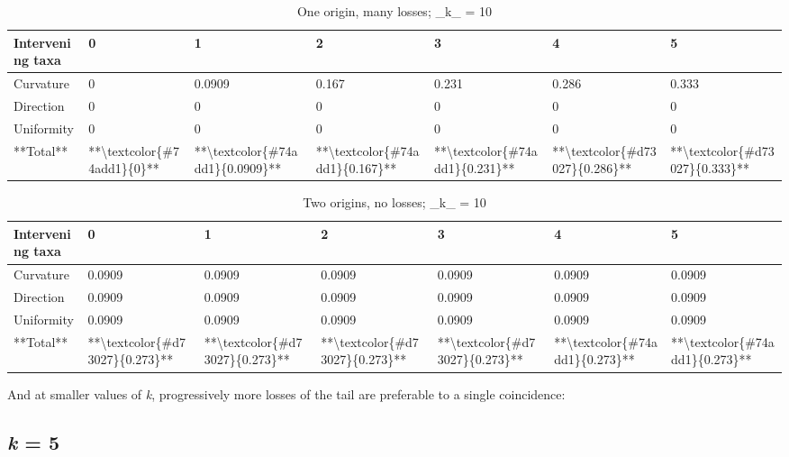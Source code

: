 \documentclass[]{book}
\theoremstyle{definition}
\theoremstyle{definition}
\theoremstyle{definition}
\theoremstyle{remark}
\begin{document}
\begin{table}

\caption{\label{tab:unnamed-chunk-74}One origin, many losses; _k_ = 10}
\centering
\begin{tabular}[t]{l|l|l|l|l|l|l}
\hline
Intervening taxa & 0 & 1 & 2 & 3 & 4 & 5\\
\hline
Curvature & 0 & 0.0909 & 0.167 & 0.231 & 0.286 & 0.333\\
\hline
Direction & 0 & 0 & 0 & 0 & 0 & 0\\
\hline
Uniformity & 0 & 0 & 0 & 0 & 0 & 0\\
\hline
**Total** & **\textbackslash{}textcolor\{\#74add1\}\{0\}** & **\textbackslash{}textcolor\{\#74add1\}\{0.0909\}** & **\textbackslash{}textcolor\{\#74add1\}\{0.167\}** & **\textbackslash{}textcolor\{\#74add1\}\{0.231\}** & **\textbackslash{}textcolor\{\#d73027\}\{0.286\}** & **\textbackslash{}textcolor\{\#d73027\}\{0.333\}**\\
\hline
\end{tabular}
\end{table}\begin{table}

\caption{\label{tab:unnamed-chunk-75}Two origins, no losses; _k_ = 10}
\centering
\begin{tabular}[t]{l|l|l|l|l|l|l}
\hline
Intervening taxa & 0 & 1 & 2 & 3 & 4 & 5\\
\hline
Curvature & 0.0909 & 0.0909 & 0.0909 & 0.0909 & 0.0909 & 0.0909\\
\hline
Direction & 0.0909 & 0.0909 & 0.0909 & 0.0909 & 0.0909 & 0.0909\\
\hline
Uniformity & 0.0909 & 0.0909 & 0.0909 & 0.0909 & 0.0909 & 0.0909\\
\hline
**Total** & **\textbackslash{}textcolor\{\#d73027\}\{0.273\}** & **\textbackslash{}textcolor\{\#d73027\}\{0.273\}** & **\textbackslash{}textcolor\{\#d73027\}\{0.273\}** & **\textbackslash{}textcolor\{\#d73027\}\{0.273\}** & **\textbackslash{}textcolor\{\#74add1\}\{0.273\}** & **\textbackslash{}textcolor\{\#74add1\}\{0.273\}**\\
\hline
\end{tabular}
\end{table}

And at smaller values of \emph{k}, progressively more losses of the tail
are preferable to a single coincidence:

\subsection{\texorpdfstring{\emph{k} = 5}{k = 5}}\label{k-5}
\end{document}
